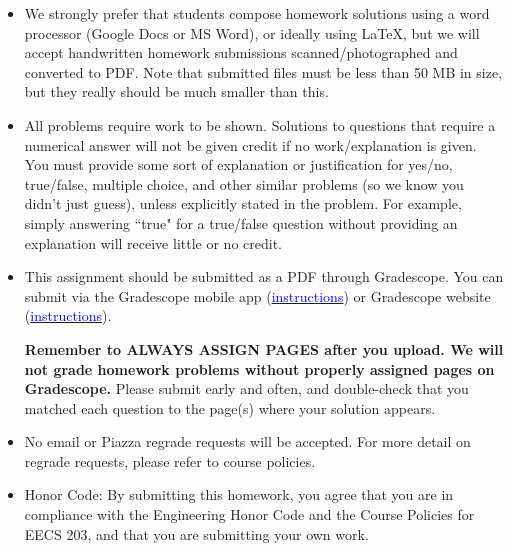 \documentclass[12pt]{exam}
\begin{document}
\begin{itemize}
    \item We strongly prefer that students compose homework solutions using a word processor (Google Docs or MS Word), or ideally using \LaTeX, but we will accept handwritten homework submissions scanned/photographed and converted to PDF. Note that submitted files must be less than 50 MB in size, but they really should be much smaller than this.
    
    \item All problems require work to be shown. Solutions to questions that require a numerical answer will not be given credit if no work/explanation is given. You must provide some sort of explanation or justification for yes/no, true/false, multiple choice, and other similar problems (so we know you didn’t just guess), unless explicitly stated in the problem. For example, simply answering ``true" for a true/false question without providing an explanation will receive little or no credit.

    \item This assignment should be submitted as a PDF through Gradescope. You can submit via the Gradescope mobile app (\href{https://www.gradescope.com/get_started#student-submission}{\textcolor{blue}{instructions}}) or Gradescope website (\href{https://guides.gradescope.com/hc/en-us/articles/21864315441677-Submitting-a-PDF-for-an-assignment}{\textcolor{blue}{instructions}}).
    
    {\bf Remember to ALWAYS ASSIGN PAGES after you upload. We will not grade homework problems without properly assigned pages on Gradescope.} Please submit early and often, and double-check that you matched each question to the page(s) where your solution appears.
    
    \item No email or Piazza regrade requests will be accepted. For more detail on regrade requests, please refer to course policies.
    
    \item Honor Code: By submitting this homework, you agree that you are in compliance with the Engineering Honor Code and the Course Policies for EECS 203, and that you are submitting your own work.
\end{itemize}
\newpage

\end{document}
